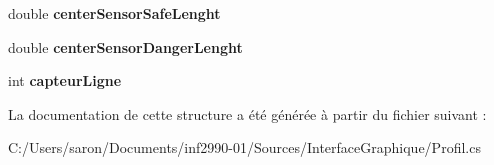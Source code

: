 \begin{DoxyCompactItemize}
\item 
\hypertarget{struct_interface_graphique_1_1_profile_data_ad8c2fed74e90028a0a185b9cef6074fd}{double {\bfseries center\-Sensor\-Safe\-Lenght}}\label{struct_interface_graphique_1_1_profile_data_ad8c2fed74e90028a0a185b9cef6074fd}

\item 
\hypertarget{struct_interface_graphique_1_1_profile_data_a779b56c6a7c3f5f3b38b2093643aeb13}{double {\bfseries center\-Sensor\-Danger\-Lenght}}\label{struct_interface_graphique_1_1_profile_data_a779b56c6a7c3f5f3b38b2093643aeb13}

\item 
\hypertarget{struct_interface_graphique_1_1_profile_data_a82739a4306b72f97cd249d37d38c8dc3}{int {\bfseries capteur\-Ligne}}\label{struct_interface_graphique_1_1_profile_data_a82739a4306b72f97cd249d37d38c8dc3}

\end{DoxyCompactItemize}


La documentation de cette structure a été générée à partir du fichier suivant \-:\begin{DoxyCompactItemize}
\item 
C\-:/\-Users/saron/\-Documents/inf2990-\/01/\-Sources/\-Interface\-Graphique/Profil.\-cs\end{DoxyCompactItemize}
